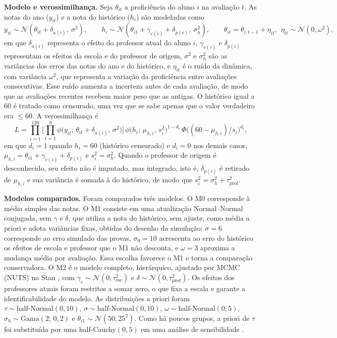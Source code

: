\documentclass[11pt,a4paper]{article}
\begin{document}
\textbf{Modelo e verossimilhança.} Seja $\theta_{it}$ a proficiência do aluno $i$ na
avaliação $t$. As notas do ano ($y_{it}$) e a nota do histórico ($h_i$) são modeladas como
\begin{equation}
  y_{it} \sim \mathcal{N}(\theta_{it} + \delta_{a(i)},\ \sigma^2), \qquad
  h_i \sim \mathcal{N}(\theta_{i1} + \gamma_{e(i)} + \delta_{p(i)},\ \sigma_h^2), \qquad
  \theta_{it} = \theta_{i,t-1} + \eta_{it},\ \ \eta_{it} \sim \mathcal{N}(0, \omega^2),
\end{equation}
em que $\delta_{a(i)}$ representa o efeito do professor atual do aluno $i$, $\gamma_{e(i)}$ e
$\delta_{p(i)}$ representam os efeitos da escola e do professor de origem, $\sigma^2$ e
$\sigma_h^2$ são as variâncias dos erros das notas do ano e do histórico, e $\eta_{it}$ é o
ruído da dinâmica, com variância $\omega^2$, que representa a variação da proficiência entre
avaliações consecutivas. Esse ruído aumenta a incerteza antes de cada avaliação, de modo que as
avaliações recentes recebem maior peso que as antigas. O histórico igual a 60 é tratado como
censurado, uma vez que se sabe apenas que o valor verdadeiro era $\le 60$. A verossimilhança é
\begin{equation}
  L = \prod_{i=1}^{120}\Big[\prod_{t=1}^{9}\phi\big(y_{it};\,\theta_{it}+\delta_{a(i)},\,\sigma^2\big)\Big]
  \,\phi\big(h_i;\,\mu_{h,i},\,s_i^2\big)^{1-d_i}\,
  \Phi\big((60-\mu_{h,i})/s_i\big)^{d_i},
\end{equation}
em que $d_i = 1$ quando $h_i = 60$ (histórico censurado) e $d_i = 0$ nos demais casos,
$\mu_{h,i} = \theta_{i1}+\gamma_{e(i)}+\delta_{p(i)}$ e $s_i^2 = \sigma_h^2$. Quando o professor
de origem é desconhecido, seu efeito não é imputado, mas integrado, isto é, $\delta_{p(i)}$ é
retirado de $\mu_{h,i}$ e sua variância é somada à do histórico, de modo que
$s_i^2 = \sigma_h^2 + \tau_{\text{prof}}^2$.

\textbf{Modelos comparados.} Foram comparados três modelos. O M0 corresponde à média simples
das notas. O M1 consiste em uma atualização Normal--Normal conjugada, sem $\gamma$ e $\delta$,
que utiliza a nota do histórico, sem ajuste, como média a priori e adota variâncias fixas,
obtidas do desenho da simulação: $\sigma = 6$ corresponde ao erro simulado das provas,
$\sigma_0 = 10$ acrescenta ao erro do histórico os efeitos de escola e professor que o M1 não
desconta, e $\omega = 3$ aproxima a mudança média por avaliação. Essa escolha favorece o M1 e
torna a comparação conservadora. O M2 é o modelo completo, hierárquico, ajustado por MCMC
(NUTS) no Stan \citep{carpenter2017}, com $\gamma_e \sim \mathcal{N}(0, \tau_{\text{esc}}^2)$ e
$\delta \sim \mathcal{N}(0, \tau_{\text{prof}}^2)$. Os efeitos dos professores atuais foram
restritos a somar zero, o que fixa a escala e garante a identificabilidade do modelo. As
distribuições a priori foram $\tau \sim \text{half-Normal}(0, 10)$,
$\sigma \sim \text{half-Normal}(0, 10)$, $\omega \sim \text{half-Normal}(0, 5)$,
$\sigma_h \sim \text{Gama}(2;\,0{,}2)$ e $\theta_{i1} \sim \mathcal{N}(50, 25^2)$. Como há
poucos grupos, a priori de $\tau$ foi substituída por uma half-Cauchy$(0, 5)$ em uma análise de
sensibilidade \citep{gelman2006}.
\end{document}
